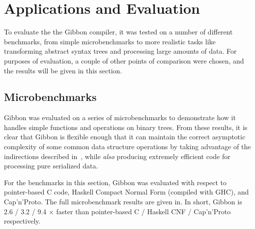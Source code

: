 


\section{Applications and Evaluation}
\label{section:applications}

To evaluate the the Gibbon compiler, it was tested on a number of different
benchmarks, from simple microbenchmarks to more realistic tasks like
transforming abstract syntax trees and processing large amounts of data.
For purposes of evaluation, a couple of other points of comparison were
chosen, and the results will be given in this section.

\subsection{Microbenchmarks}

Gibbon was evaluated on a series of microbenchmarks to demonstrate how it
handles simple functions and operations on binary trees. From these results,
it is clear that Gibbon is flexible enough that it can maintain the
correct asymptotic complexity of some common data structure operations by
taking advantage of the indirections described in~,
while \emph{also} producing extremely efficient code for processing
pure serialized data.

For the benchmarks in this section, Gibbon was evaluated with respect to
pointer-based C code, Haskell Compact Normal Form (compiled with GHC),
and Cap'n'Proto.
%
The full microbenchmark results are given in. In short,
Gibbon is 2.6 / 3.2 / 9.4 $\times$ faster than pointer-based C / Haskell CNF /
Cap'n'Proto respectively.


